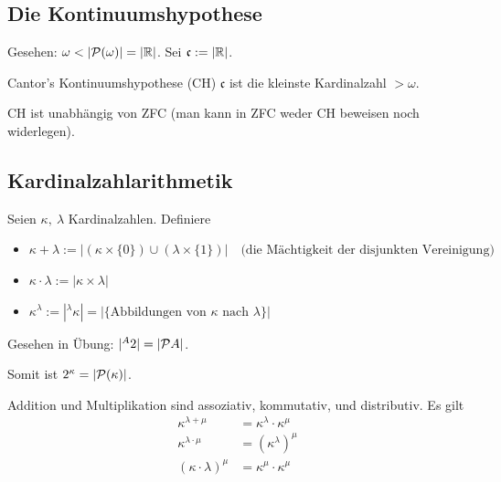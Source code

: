 \documentclass[12pt]{article}
\begin{document}
\subsection{Die Kontinuumshypothese}

Gesehen: $\omega < |\mathcal{P}(\omega)| = |\mathbb{R}|$. Sei $\mathfrak{c} := |\mathbb{R}|$.
\begin{definition}{Cantor's Kontinuumshypothese (CH)}{}
    $\mathfrak{c}$ ist die kleinste Kardinalzahl $> \omega$.
\end{definition}

\begin{remark}{}{}
    CH ist unabhängig von ZFC (man kann in ZFC weder CH beweisen noch widerlegen).
\end{remark}

\subsection{Kardinalzahlarithmetik}

\begin{definition}{}{}
    Seien $\kappa,\ \lambda$ Kardinalzahlen. Definiere

    \begin{itemize}
        \item $\kappa + \lambda := \lvert \left(\kappa \times \{0\}\right) \cup \left(\lambda \times \{1\}\right) \rvert\quad \text{(die Mächtigkeit der disjunkten Vereinigung)}$
        \item $\kappa \cdot \lambda := \lvert \kappa \times \lambda \rvert$
        \item $\kappa^\lambda := |{}^\lambda \kappa| = \lvert \{\text{Abbildungen von } \kappa \text{ nach } \lambda\} \rvert$
    \end{itemize}
\end{definition}

\begin{example}{}{}
    Gesehen in Übung: $\lvert {}^A 2 \rvert = \lvert \mathcal{P}{A} \rvert$.

    Somit ist $2^\kappa = \lvert \mathcal{P}(\kappa) \rvert$.
\end{example}

\begin{proposition}{}{}
    Addition und Multiplikation sind assoziativ, kommutativ, und distributiv. Es gilt
    $$
    \begin{aligned}
        \kappa^{\lambda + \mu} &= \kappa^\lambda \cdot \kappa^\mu \\
        \kappa^{\lambda \cdot \mu} &=  \left(\kappa^\lambda\right)^\mu \\
        \left( \kappa \cdot \lambda \right)^\mu &= \kappa^\mu \cdot \kappa^\mu
    \end{aligned}
    $$
\end{proposition}
\end{document}
